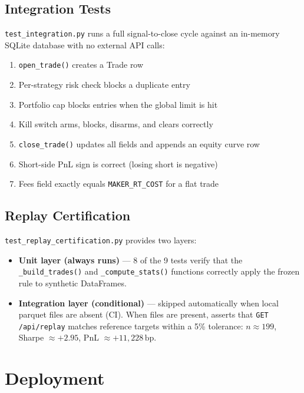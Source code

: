 \documentclass[12pt, a4paper]{article}
\theoremstyle{definition}
\newcommand{\bp}{\,\text{bp}}
\begin{document}
\subsection{Integration Tests}

\texttt{test\_integration.py} runs a full signal-to-close cycle against an
in-memory SQLite database with no external API calls:

\begin{enumerate}[leftmargin=2em]
    \item \texttt{open\_trade()} creates a Trade row
    \item Per-strategy risk check blocks a duplicate entry
    \item Portfolio cap blocks entries when the global limit is hit
    \item Kill switch arms, blocks, disarms, and clears correctly
    \item \texttt{close\_trade()} updates all fields and appends an equity curve row
    \item Short-side PnL sign is correct (losing short is negative)
    \item Fees field exactly equals \texttt{MAKER\_RT\_COST} for a flat trade
\end{enumerate}

\subsection{Replay Certification}

\texttt{test\_replay\_certification.py} provides two layers:

\begin{itemize}[leftmargin=2em]
    \item \textbf{Unit layer (always runs)} — 8 of the 9 tests verify that the
          \texttt{\_build\_trades()} and \texttt{\_compute\_stats()} functions
          correctly apply the frozen rule to synthetic DataFrames.
    \item \textbf{Integration layer (conditional)} — skipped automatically when
          local parquet files are absent (CI). When files are present,
          asserts that \texttt{GET /api/replay} matches reference targets within
          a 5\% tolerance:
          $n \approx 199$, Sharpe $\approx +2.95$, PnL $\approx +11{,}228\bp$.
\end{itemize}

\section{Deployment}
\end{document}
